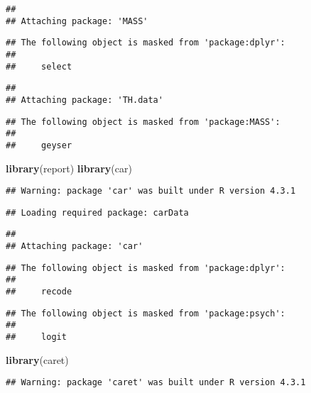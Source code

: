 \documentclass[
]{article}
\newenvironment{Shaded}{\begin{snugshade}}{\end{snugshade}}
\newcommand{\FunctionTok}[1]{\textcolor[rgb]{0.13,0.29,0.53}{\textbf{#1}}}
\newcommand{\NormalTok}[1]{#1}
\begin{document}
\begin{verbatim}
## 
## Attaching package: 'MASS'
\end{verbatim}

\begin{verbatim}
## The following object is masked from 'package:dplyr':
## 
##     select
\end{verbatim}

\begin{verbatim}
## 
## Attaching package: 'TH.data'
\end{verbatim}

\begin{verbatim}
## The following object is masked from 'package:MASS':
## 
##     geyser
\end{verbatim}

\begin{Shaded}
\begin{Highlighting}[]
\FunctionTok{library}\NormalTok{(report)}
\FunctionTok{library}\NormalTok{(car)}
\end{Highlighting}
\end{Shaded}

\begin{verbatim}
## Warning: package 'car' was built under R version 4.3.1
\end{verbatim}

\begin{verbatim}
## Loading required package: carData
\end{verbatim}

\begin{verbatim}
## 
## Attaching package: 'car'
\end{verbatim}

\begin{verbatim}
## The following object is masked from 'package:dplyr':
## 
##     recode
\end{verbatim}

\begin{verbatim}
## The following object is masked from 'package:psych':
## 
##     logit
\end{verbatim}

\begin{Shaded}
\begin{Highlighting}[]
\FunctionTok{library}\NormalTok{(caret)}
\end{Highlighting}
\end{Shaded}

\begin{verbatim}
## Warning: package 'caret' was built under R version 4.3.1
\end{verbatim}
\end{document}
